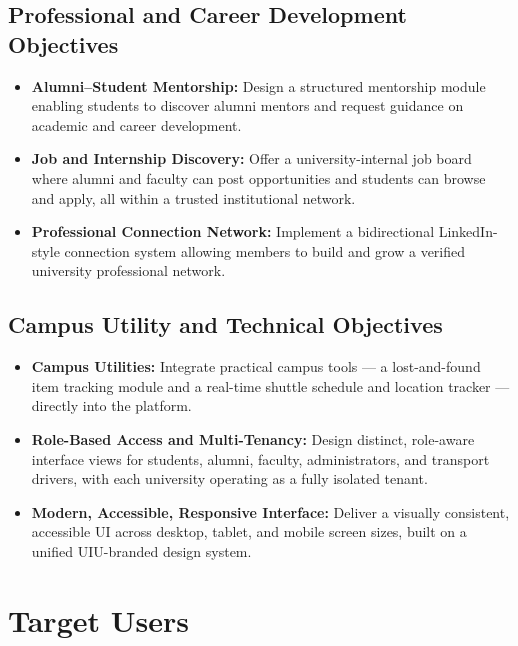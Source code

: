 \documentclass[12pt, a4paper]{article}
\begin{document}
\subsection{Professional and Career Development Objectives}

\begin{itemize}
    \item \textbf{Alumni--Student Mentorship:} Design a structured mentorship module
    enabling students to discover alumni mentors and request guidance on academic and
    career development.

    \item \textbf{Job and Internship Discovery:} Offer a university-internal job board
    where alumni and faculty can post opportunities and students can browse and apply,
    all within a trusted institutional network.

    \item \textbf{Professional Connection Network:} Implement a bidirectional
    LinkedIn-style connection system allowing members to build and grow a verified
    university professional network.
\end{itemize}

\subsection{Campus Utility and Technical Objectives}

\begin{itemize}
    \item \textbf{Campus Utilities:} Integrate practical campus tools --- a
    lost-and-found item tracking module and a real-time shuttle schedule and location
    tracker --- directly into the platform.

    \item \textbf{Role-Based Access and Multi-Tenancy:} Design distinct, role-aware
    interface views for students, alumni, faculty, administrators, and transport drivers,
    with each university operating as a fully isolated tenant.

    \item \textbf{Modern, Accessible, Responsive Interface:} Deliver a visually
    consistent, accessible UI across desktop, tablet, and mobile screen sizes, built
    on a unified UIU-branded design system.
\end{itemize}

\section{Target Users}
\end{document}
